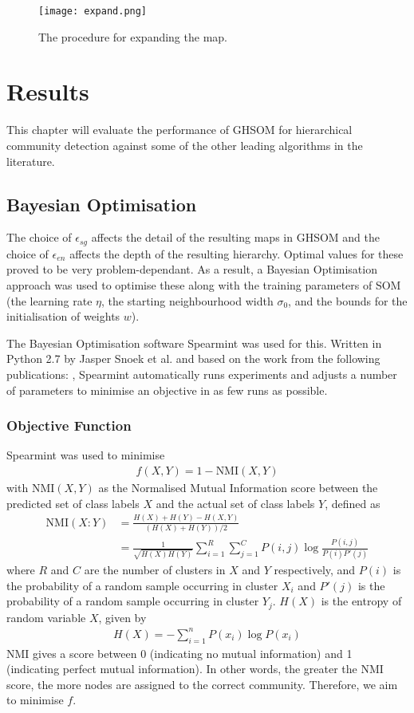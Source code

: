 \documentclass{report}
\begin{document}
\begin{figure}
\centering
\texttt{[image: expand.png]}
\caption{The procedure for expanding the map.}
\label{expand_map}
\end{figure}

\chapter{Results}
This chapter will evaluate the performance of GHSOM for hierarchical community detection against some of the other leading algorithms in the literature.
\section{Bayesian Optimisation}
The choice of $\epsilon_{sg}$ affects the detail of the resulting maps in GHSOM and the choice of $\epsilon_{en}$ affects the depth of the resulting hierarchy. Optimal values for these proved to be very problem-dependant. As a result, a Bayesian Optimisation approach was used to optimise these along with the training parameters of SOM (the learning rate $\eta$, the starting neighbourhood width $\sigma_0$, and the bounds for the initialisation of weights $w$).

The Bayesian Optimisation software Spearmint was used for this. Written in Python 2.7 by Jasper Snoek et al. and based on the work from the following publications: \cite{snoek2012practical,swersky2013multi,snoek2013bayesian,snoek2014input,gelbart2014bayesian}, Spearmint automatically runs experiments and adjusts a number of parameters to minimise an objective in as few runs as possible.

\subsection{Objective Function}
Spearmint was used to minimise 
\begin{align*}
f(X, Y) = 1 - \text{NMI}(X, Y) 
\end{align*}
with NMI$(X,Y)$ as the Normalised Mutual Information score between the predicted set of class labels $X$ and the actual set of class labels $Y$, defined as
\begin{align*}
\text{NMI}(X : Y) &= \frac{H(X)+H(Y)-H(X,Y)}{(H(X)+H(Y))/2} \\
&= \frac{1}{\sqrt{H(X) H(Y)} }\sum_{i=1}^R \sum_{j=1}^C P(i,j) \log \frac{P(i,j)}{P(i)P'(j)}
\end{align*}
where $R$ and $C$ are the number of clusters in $X$ and $Y$ respectively, and $P(i)$ is the probability of a random sample occurring in cluster $X_i$ and $P'(j)$ is the probability of a random sample occurring in cluster $Y_j$. $H(X)$ is the entropy of random variable $X$, given by 
\begin{align*}
H(X) = -\sum_{i=1}^n P(x_i) \log P(x_i)
\end{align*}
NMI gives a score between 0 (indicating no mutual information) and 1 (indicating perfect mutual information). In other words, the greater the NMI score, the more nodes are assigned to the correct community. Therefore, we aim to minimise $f$.
\end{document}
